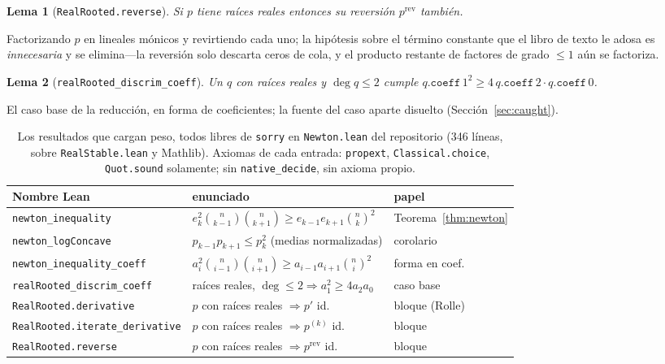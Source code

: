 \documentclass[11pt]{article}
\newtheorem{lemma}{Lema}
\newcommand{\lean}[1]{\texttt{#1}}
\begin{document}
\begin{lemma}[\lean{RealRooted.reverse}]
Si $p$ tiene ra\'ices reales entonces su reversi\'on $p^{\mathrm{rev}}$ tambi\'en.
\end{lemma}
Factorizando $p$ en lineales m\'onicos y revirtiendo cada uno; la hip\'otesis sobre el t\'ermino
constante que el libro de texto le adosa es \emph{innecesaria} y se elimina---la reversi\'on solo
descarta ceros de cola, y el producto restante de factores de grado $\le1$ a\'un se factoriza.

\begin{lemma}[\lean{realRooted\_discrim\_coeff}]
Un $q$ con ra\'ices reales y $\deg q\le2$ cumple $q.\mathtt{coeff}\,1^2\ge4\,q.\mathtt{coeff}\,2\cdot
q.\mathtt{coeff}\,0$.
\end{lemma}
El caso base de la reducci\'on, en forma de coeficientes; la fuente del caso aparte disuelto
(Secci\'on~\ref{sec:caught}).

\begin{table}[h]
\centering\small
{}
\begin{tabular}{@{}lll@{}}
\toprule
\rowcolor{ggteal!18} Nombre Lean & enunciado & papel \\
\midrule
\lean{newton\_inequality} & $e_k^2\binom{n}{k-1}\binom{n}{k+1}\ge e_{k-1}e_{k+1}\binom{n}{k}^2$ & Teorema~\ref{thm:newton} \\
\lean{newton\_logConcave} & $p_{k-1}p_{k+1}\le p_k^2$ (medias normalizadas) & corolario \\
\lean{newton\_inequality\_coeff} & $a_i^2\binom{n}{i-1}\binom{n}{i+1}\ge a_{i-1}a_{i+1}\binom{n}{i}^2$ & forma en coef. \\
\lean{realRooted\_discrim\_coeff} & ra\'ices reales, $\deg\le2\Rightarrow a_1^2\ge4a_2a_0$ & caso base \\
\lean{RealRooted.derivative} & $p$ con ra\'ices reales $\Rightarrow p'$ id. & bloque (Rolle) \\
\lean{RealRooted.iterate\_derivative} & $p$ con ra\'ices reales $\Rightarrow p^{(k)}$ id. & bloque \\
\lean{RealRooted.reverse} & $p$ con ra\'ices reales $\Rightarrow p^{\mathrm{rev}}$ id. & bloque \\
\bottomrule
\end{tabular}
\caption{Los resultados que cargan peso, todos libres de \lean{sorry} en \lean{Newton.lean} del
repositorio (346 l\'ineas, sobre \lean{RealStable.lean} y Mathlib). Axiomas de cada entrada:
\lean{propext}, \lean{Classical.choice}, \lean{Quot.sound} solamente; sin \lean{native\_decide}, sin
axioma propio.}
\label{tab:inventory}
\end{table}
\end{document}
